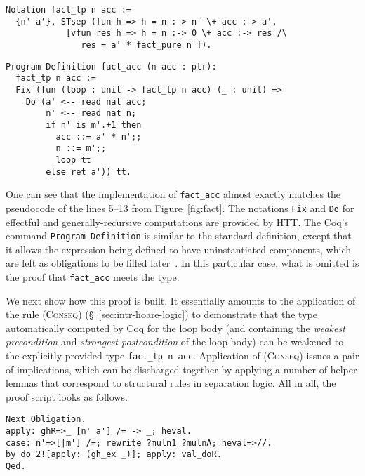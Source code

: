 \documentclass[blockstyle,preprint,nocopyrightspace]{sigplanconf}
\newcommand{\code}[1]{\lstinline{#1}}
\begin{document}

\begin{lstlisting}
Notation fact_tp n acc := 
  {n' a'}, STsep (fun h => h = n :-> n' \+ acc :-> a',
            [vfun res h => h = n :-> 0 \+ acc :-> res /\ 
               res = a' * fact_pure n']).
\end{lstlisting}

\begin{lstlisting}
Program Definition fact_acc (n acc : ptr): 
  fact_tp n acc := 
  Fix (fun (loop : unit -> fact_tp n acc) (_ : unit) => 
    Do (a' <-- read nat acc;
        n' <-- read nat n;
        if n' is m'.+1 then 
          acc ::= a' * n';; 
          n ::= m';;
          loop tt
        else ret a')) tt.
\end{lstlisting}

%
One can see that the implementation of \code{fact_acc} almost exactly
matches the pseudocode of the lines 5--13 from
Figure~\ref{fig:fact}. The notations \code{Fix} and \code{Do} for
effectful and generally-recursive computations are provided by HTT.
%
The Coq's command \code{Program Definition} is similar to the standard
definition, except that it allows the expression being defined to have
uninstantiated components, which are left as obligations to be filled
later~\cite{Sozeau:TYPES06}. In this particular case, what is omitted
is the proof that \code{fact_acc} meets the type. 
%

We next show how this proof is built. It essentially amounts to the
application of the rule \textsc{(Conseq)}
(\S~\ref{sec:intr-hoare-logic}) to demonstrate that the type
automatically computed by Coq for the loop body (and containing the
\emph{weakest precondition} and \emph{strongest postcondition} of the
loop body) can be weakened to the explicitly provided type
\code{fact_tp n acc}. Application of \textsc{(Conseq)} issues a pair
of implications, which can be discharged together by applying a number
of helper lemmas that correspond to structural rules in separation
logic. All in all, the proof script looks as follows.
\begin{lstlisting}
Next Obligation.
apply: ghR=>_ [n' a'] /= -> _; heval.
case: n'=>[|m'] /=; rewrite ?muln1 ?mulnA; heval=>//.
by do 2![apply: (gh_ex _)]; apply: val_doR. 
Qed.
\end{lstlisting}
%
\end{document}
